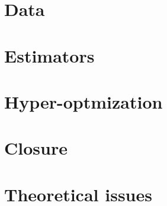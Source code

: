 \documentclass[11pt,twoside]{article}
\begin{document}
\section{Data}
\label{sec:data}


\section{Estimators}
\label{sec:estimators}


\section{Hyper-optmization}
\label{sec:hyper-opt}


\section{Closure}
\label{sec:closure}


\section{Theoretical issues}
\label{sec:theor-issues}

\end{document}
